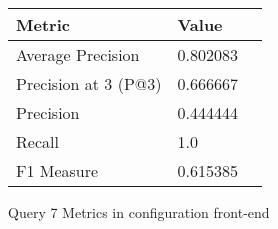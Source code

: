 \begin{figure}[H]
\begin{center}
\begin{tabular}{lll}
\toprule
{}                      Metric &         Value \\
\midrule
     Average Precision &  0.802083 \\
  Precision at 3 (P@3) &  0.666667 \\
             Precision &  0.444444 \\
                Recall &       1.0 \\
            F1 Measure &  0.615385 \\
\bottomrule
\end{tabular}
\end{center}
\caption{Query 7 Metrics in configuration front-end}
\label{fig:query_7_metrics_config_front-end}
\end{figure}